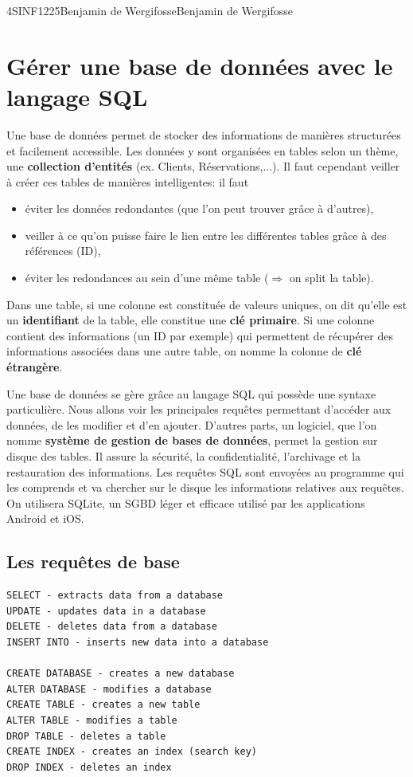 

\usepackage{graphicx}
\usepackage{verbatim}

\lstset{language=SQL}

{4}{SINF}{1225}{Benjamin de Wergifosse}{Benjamin de Wergifosse}

\section{Gérer une base de données avec le langage SQL}
Une base de données permet de stocker des informations de manières structurées
et facilement accessible.
Les données y sont organisées en tables selon un thème,
une \textbf{collection d'entités} (ex. Clients, Réservations,...).
Il faut cependant veiller à créer ces tables de manières intelligentes:
il faut
\begin{itemize}
  \item éviter les données redondantes
    (que l'on peut trouver grâce à d'autres),
  \item veiller à ce qu'on puisse faire le lien entre les différentes
    tables grâce à des références (ID),
  \item éviter les redondances au sein d'une même table
    ($\Rightarrow$ on split la table).
\end{itemize}

Dans une table,
si une colonne est constituée de valeurs uniques,
on dit qu'elle est un \textbf{identifiant} de la table,
elle constitue une \textbf{clé primaire}.
Si une colonne contient des informations (un ID par exemple) qui permettent
de récupérer des informations associées dans une autre table,
on nomme la colonne de \textbf{clé étrangère}.

Une base de données se gère grâce au langage SQL
qui possède une syntaxe particulière.
Nous allons voir les principales requêtes permettant d'accéder aux données,
de les modifier et d'en ajouter.
D'autres parts, un logiciel,
que l'on nomme \textbf{système de gestion de bases de données},
permet la gestion sur disque des tables.
Il assure la sécurité, la confidentialité,
l'archivage et la restauration des informations.
Les requêtes SQL sont envoyées au programme qui les comprends et
va chercher sur le disque les informations relatives aux requêtes.
On utilisera SQLite,
un SGBD léger et efficace utilisé par les applications Android et iOS.

\subsection{Les requêtes de base}
\begin{lstlisting}
SELECT - extracts data from a database
UPDATE - updates data in a database
DELETE - deletes data from a database
INSERT INTO - inserts new data into a database

CREATE DATABASE - creates a new database
ALTER DATABASE - modifies a database
CREATE TABLE - creates a new table
ALTER TABLE - modifies a table
DROP TABLE - deletes a table
CREATE INDEX - creates an index (search key)
DROP INDEX - deletes an index
\end{lstlisting}

